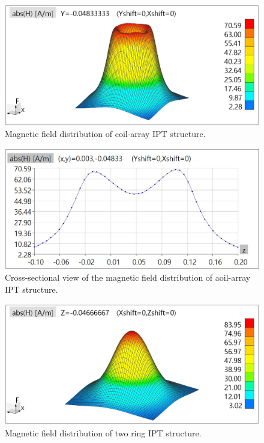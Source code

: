 \begin{figure}[htbp]
    \centering
    \includegraphics[width=0.9\linewidth]{images/4_coil_array_near_field_distribution.JPG}
    \caption{Magnetic field distribution of coil-array IPT structure.}
\end{figure}

\begin{figure}[htbp]
    \centering
    \includegraphics[width=0.9\linewidth]{images/4_coil_array_near_field_distribution_cut.JPG}
    \caption{Cross-sectional view of the magnetic field distribution of aoil-array IPT structure.}
\end{figure}

\begin{figure}[htbp]
    \centering
    \includegraphics[width=0.9\linewidth]{images/4_two_ring_near_field_distribution.JPG}
    \caption{Magnetic field distribution of two ring IPT structure.}
\end{figure}

